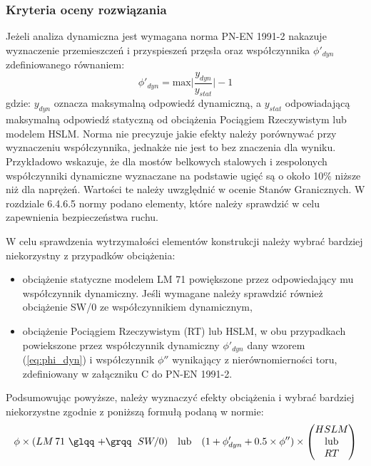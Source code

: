 \subsubsection{Kryteria oceny rozwiązania} \label{sect: eurokod_kryteria_oceny}
Jeżeli analiza dynamiczna jest wymagana norma PN-EN 1991-2 nakazuje wyznaczenie przemieszczeń i przyspieszeń przęsła oraz współczynnika $\phi'_{dyn}$ zdefiniowanego równaniem:
\begin{equation} \label{eq:phi_dyn}
	\phi '_{dyn} = \text{max}\Big| \frac{y_{dyn}}{y_{stat}} \Big| -1
\end{equation}
gdzie: $y_{dyn}$ oznacza maksymalną odpowiedź dynamiczną, a $y_{stat}$ odpowiadającą maksymalną odpowiedź statyczną od obciążenia Pociągiem Rzeczywistym lub modelem HSLM. Norma nie precyzuje jakie efekty należy porównywać przy wyznaczeniu współczynnika, jednakże nie jest to bez znaczenia dla wyniku. Przykładowo \cite{Klasztorny2005} wskazuje, że dla mostów belkowych stalowych i zespolonych współczynniki dynamiczne wyznaczane na podstawie ugięć są o około 10\% niższe niż dla naprężeń. Wartości te należy uwzględnić w ocenie Stanów Granicznych. W rozdziale 6.4.6.5 normy podano elementy, które należy sprawdzić w celu zapewnienia bezpieczeństwa ruchu. 

W celu sprawdzenia wytrzymałości elementów konstrukcji należy wybrać bardziej niekorzystny z przypadków obciążenia:
\begin{itemize}
	\item obciążenie statyczne modelem LM 71 powiększone przez odpowiedający mu współczynnik dynamiczny. Jeśli wymagane należy sprawdzić również obciążenie SW/0 ze współczynnikiem dynamicznym,
	\item obciążenie Pociągiem Rzeczywistym (RT) lub HSLM, w obu przypadkach powiekszone przez współczynnik dynamiczny $\phi '_{dyn}$ dany wzorem (\ref{eq:phi_dyn}) i współczynnik $\phi''$ wynikający z nierównomierności toru, zdefiniowany w załączniku C do PN-EN 1991-2.
\end{itemize}
Podsumowując powyższe, należy wyznaczyć efekty obciążenia i wybrać bardziej niekorzystne zgodnie z poniższą formułą podaną w normie:
\begin{equation} \label{eq:SGN_dyna}
	\phi \times (LM\,71 \text{ \glqq +\grqq }\; SW/0)\quad \text{lub} \quad
	(1+\phi '_{dyn}+0.5 \times \phi'') \times 
	\begin{pmatrix}
		HSLM \\
		\text{lub} \\
		RT
	\end{pmatrix}
\end{equation}

